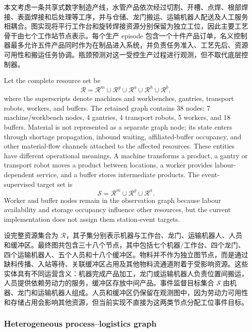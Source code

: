 \documentclass[a4paper,fleqn]{cas-dc}
\newcommand{\zhpara}[1]{%
  \par\begingroup\small\color{black!72}\noindent #1\par\endgroup}
\begin{document}
\zhpara{本文考虑一条共享式数字制造产线，水管产品依次经过切割、开槽、点焊、根部焊接、表面焊接和后处理等工序，并与仓储、龙门搬运、运输机器人配送及人工服务相耦合。图实现将平行工作台和旋转焊接资源分别保留为独立工位，因此主要工艺骨干由七个工作站节点表示。每个生产 episode 包含一个十件产品订单，名义控制器最多允许五件产品同时作为在制品进入系统，并负责任务准入、工艺先后、资源可用性和搬运任务协调。瓶颈预测对这一受控生产过程进行观测，但不取代底层控制器。}

Let the complete resource set be
\begin{equation}
\mathcal{R}=\mathcal{R}^{m}\cup\mathcal{R}^{g}\cup
\mathcal{R}^{a}\cup\mathcal{R}^{h}\cup\mathcal{R}^{b},
\end{equation}
where the superscripts denote machines and workbenches, gantries, transport robots, workers, and buffers. The retained graph contains 38 nodes: 7 machine/workbench nodes, 4 gantries, 4 transport robots, 5 workers, and 18 buffers. Material is not represented as a separate graph node; its state enters through shortage propagation, inbound waiting, affiliated-buffer occupancy, and other material-flow channels attached to the affected resources. These entities have different operational meanings. A machine transforms a product, a gantry or transport robot moves a product between locations, a worker provides labour-dependent service, and a buffer stores intermediate products. The event-supervised target set is
\begin{equation}
\mathcal{S}=\mathcal{R}^{m}\cup\mathcal{R}^{g}\cup\mathcal{R}^{a}.
\end{equation}
Worker and buffer nodes remain in the observation graph because labour availability and storage occupancy influence other resources, but the current implementation does not assign them station-event targets.

\zhpara{设完整资源集合为 $\mathcal{R}$，其子集分别表示机器与工作台、龙门、运输机器人、人员和缓冲区。最终图共包含三十八个节点，其中包括七个机器/工作台、四个龙门、四个运输机器人、五个人员和十八个缓冲区。物料并不作为独立图节点，而是通过缺料传播、入站等待、关联缓冲区占用及其他物料流通道附着于受影响资源。这些实体具有不同运营含义：机器完成产品加工，龙门或运输机器人负责位置间搬运，人员提供依赖劳动力的服务，缓冲区存放中间产品。事件监督目标集合 $\mathcal{S}$ 由机器、龙门和运输机器人组成。人员和缓冲区仍保留在观测图中，因为劳动力可用性和存储占用会影响其他资源，但当前实现不直接为这两类节点分配工位事件目标。}

\subsubsection{Heterogeneous process--logistics graph}
\end{document}
